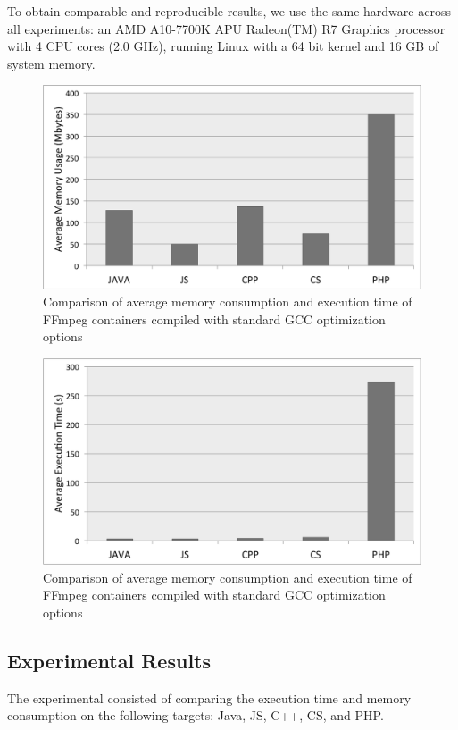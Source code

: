 To obtain comparable and reproducible results, we use the
same hardware across all experiments: an AMD A10-7700K
APU Radeon(TM) R7 Graphics processor with 4 CPU cores
(2.0 GHz), running Linux with a 64 bit kernel and 16 GB of
system memory.
\begin{figure}[h]
	\centering
	\includegraphics[width=1\linewidth]{Ressources/avgmem.pdf}
	\caption{Comparison of average memory consumption and execution time of FFmpeg containers compiled with standard GCC optimization options}
\end{figure}
\begin{figure}[h]
	\centering
	\includegraphics[width=1\linewidth]{Ressources/avgtime.pdf}
	\caption{Comparison of average memory consumption and execution time of FFmpeg containers compiled with standard GCC optimization options}
\end{figure}
\subsection{Experimental Results}
The experimental consisted of comparing the execution time and memory consumption on the following targets: Java, JS, C++, CS, and PHP.

